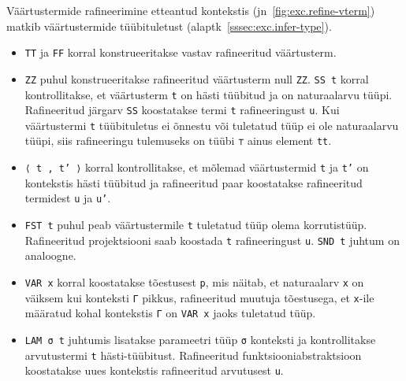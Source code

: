 \documentclass[a4paper,12pt]{article}
\begin{document}
Väärtustermide rafineerimine etteantud kontekstis (jn~\ref{fig:exc.refine-vterm}) matkib väärtustermide tüübituletust (alaptk~\ref{sssec:exc.infer-type}).
\begin{itemize}
\item {\tt TT} ja {\tt FF} korral konstrueeritakse vastav rafineeritud väärtusterm.
\item {\tt ZZ} puhul konstrueeritakse rafineeritud väärtusterm null {\tt ZZ}. {\tt SS t} korral kontrollitakse, et väärtusterm {\tt t} on hästi tüübitud ja on naturaalarvu tüüpi. Rafineeritud järgarv {\tt SS} koostatakse termi {\tt t} rafineeringust {\tt u}. Kui väärtustermi {\tt t} tüübituletus ei õnnestu või tuletatud tüüp ei ole naturaalarvu tüüpi, siis rafineeringu tulemuseks on tüübi {\tt ⊤} ainus element {\tt tt}.
\item {\tt ⟨ t , t' ⟩} korral kontrollitakse, et mõlemad väärtustermid {\tt t} ja {\tt t'} on kontekstis hästi tüübitud ja rafineeritud paar koostatakse rafineeritud termidest {\tt u} ja {\tt u'}.
\item {\tt FST t} puhul peab väärtustermile {\tt t} tuletatud tüüp olema korrutistüüp. Rafineeritud projektsiooni saab koostada {\tt t} rafineeringust {\tt u}. {\tt SND t} juhtum on analoogne.
\item {\tt VAR x} korral koostatakse tõestusest {\tt p}, mis näitab, et naturaalarv {\tt x} on väiksem kui konteksti {\tt Γ} pikkus, rafineeritud muutuja tõestusega, et {\tt x}-ile määratud kohal kontekstis {\tt Γ} on {\tt VAR x} jaoks tuletatud tüüp.
\item {\tt LAM σ t} juhtumis lisatakse parameetri tüüp {\tt σ} konteksti ja kontrollitakse arvutustermi {\tt t} hästi-tüübitust. Rafineeritud funktsiooniabstraktsioon koostatakse uues kontekstis rafineeritud arvutusest {\tt u}.
\end{itemize}
\end{document}
